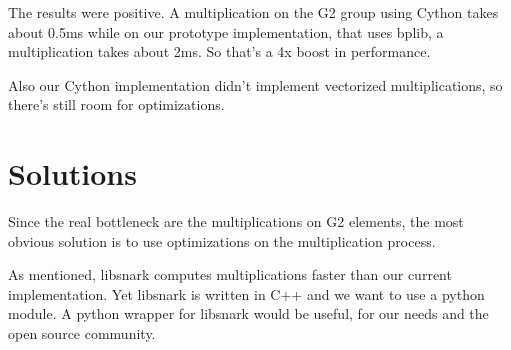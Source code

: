\documentclass{article}
\begin{document}
The results were positive. A multiplication on the G2 group using Cython
takes about 0.5ms while on our prototype implementation, that uses bplib,
a multiplication takes about 2ms. So that's a 4x boost in performance.

Also our Cython implementation didn't implement vectorized multiplications,
so there's still room for optimizations.


\section{Solutions}

Since the real bottleneck are the multiplications on G2 elements,
the most obvious solution is to use optimizations on the multiplication
process.

As mentioned, libsnark computes multiplications faster than
our current implementation. Yet libsnark is written in C++
and we want to use a python module. A python wrapper for
libsnark would be useful, for our needs and the open source community.




\end{document}
